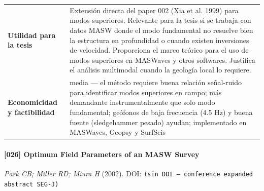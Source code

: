 \begin{center}
\begin{tabularx}{\textwidth}{@{}>{\bfseries}p{3.3cm} X@{}}
Utilidad para la tesis & Extensión directa del paper 002 (Xia et al. 1999) para modos superiores. Relevante para la tesis si se trabaja con datos MASW donde el modo fundamental no resuelve bien la estructura en profundidad o cuando existen inversiones de velocidad. Proporciona el marco teórico para el uso de modos superiores en MASWaves y otros softwares. Justifica el análisis multimodal cuando la geología local lo requiere. \\
Economicidad y factibilidad & media --- el método requiere buena relación señal-ruido para identificar modos superiores en campo; más demandante instrumentalmente que solo modo fundamental; geófonos de baja frecuencia (4.5 Hz) y buena fuente (sledgehammer pesado) ayudan; implementado en MASWaves, Geopsy y SurfSeis \\
\bottomrule
\end{tabularx}
\end{center}

\paragraph{[026] Optimum Field Parameters of an MASW Survey} \emph{Park CB; Miller RD; Miura H} (2002).
{\scriptsize DOI: \texttt{(sin DOI --- conference expanded abstract SEG-J)}}

